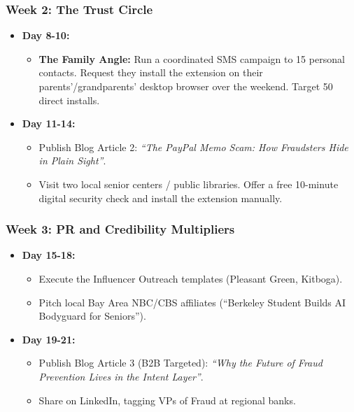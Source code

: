 \documentclass[
]{article}
\providecommand{\tightlist}{%
  \setlength{\itemsep}{0pt}\setlength{\parskip}{0pt}}
\begin{document}
\subsubsection{Week 2: The Trust Circle}\label{week-2-the-trust-circle}

\begin{itemize}
\tightlist
\item
  \textbf{Day 8-10:}

  \begin{itemize}
  \tightlist
  \item
    \textbf{The Family Angle:} Run a coordinated SMS campaign to 15
    personal contacts. Request they install the extension on their
    parents'/grandparents' desktop browser over the weekend. Target 50
    direct installs.
  \end{itemize}
\item
  \textbf{Day 11-14:}

  \begin{itemize}
  \tightlist
  \item
    Publish Blog Article 2: \emph{``The PayPal Memo Scam: How Fraudsters
    Hide in Plain Sight''}.
  \item
    Visit two local senior centers / public libraries. Offer a free
    10-minute digital security check and install the extension manually.
  \end{itemize}
\end{itemize}

\subsubsection{Week 3: PR and Credibility
Multipliers}\label{week-3-pr-and-credibility-multipliers}

\begin{itemize}
\tightlist
\item
  \textbf{Day 15-18:}

  \begin{itemize}
  \tightlist
  \item
    Execute the Influencer Outreach templates (Pleasant Green, Kitboga).
  \item
    Pitch local Bay Area NBC/CBS affiliates (``Berkeley Student Builds
    AI Bodyguard for Seniors'').
  \end{itemize}
\item
  \textbf{Day 19-21:}

  \begin{itemize}
  \tightlist
  \item
    Publish Blog Article 3 (B2B Targeted): \emph{``Why the Future of
    Fraud Prevention Lives in the Intent Layer''}.
  \item
    Share on LinkedIn, tagging VPs of Fraud at regional banks.
  \end{itemize}
\end{itemize}
\end{document}
